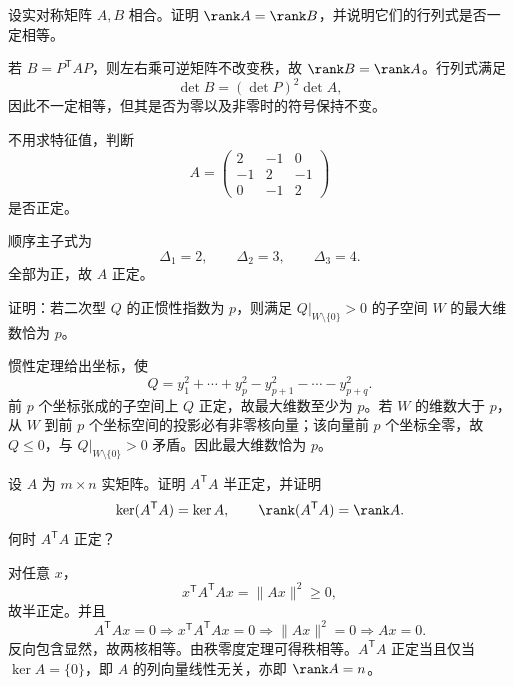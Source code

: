 \begin{exercise}[level=standard]
设实对称矩阵 $A,B$ 相合。证明 $\rank A=\rank B$，并说明它们的行列式是否一定相等。
\begin{solution}
若 $B=P^{\mathsf T}AP$，则左右乘可逆矩阵不改变秩，故 $\rank B=\rank A$。行列式满足
\[
\det B=(\det P)^2\det A,
\]
因此不一定相等，但其是否为零以及非零时的符号保持不变。
\end{solution}
\end{exercise}

\begin{exercise}[level=standard]
不用求特征值，判断
\[
A=\begin{pmatrix}2&-1&0\\-1&2&-1\\0&-1&2\end{pmatrix}
\]
是否正定。
\begin{solution}
顺序主子式为
\[
\Delta_1=2,\qquad \Delta_2=3,\qquad \Delta_3=4.
\]
全部为正，故 $A$ 正定。
\end{solution}
\end{exercise}

\begin{exercise}[level=advanced]
证明：若二次型 $Q$ 的正惯性指数为 $p$，则满足 $Q|_{W\setminus\{0\}}>0$ 的子空间 $W$ 的最大维数恰为 $p$。
\begin{solution}
惯性定理给出坐标，使
\[
Q=y_1^2+\cdots+y_p^2-y_{p+1}^2-\cdots-y_{p+q}^2.
\]
前 $p$ 个坐标张成的子空间上 $Q$ 正定，故最大维数至少为 $p$。若 $W$ 的维数大于 $p$，从 $W$ 到前 $p$ 个坐标空间的投影必有非零核向量；该向量前 $p$ 个坐标全零，故 $Q\le0$，与 $Q|_{W\setminus\{0\}}>0$ 矛盾。因此最大维数恰为 $p$。
\end{solution}
\end{exercise}

\begin{exercise}[level=advanced]
设 $A$ 为 $m\times n$ 实矩阵。证明 $A^{\mathsf T}A$ 半正定，并证明
\[
\ker(A^{\mathsf T}A)=\ker A,\qquad \rank(A^{\mathsf T}A)=\rank A.
\]
何时 $A^{\mathsf T}A$ 正定？
\begin{solution}
对任意 $x$，
\[
x^{\mathsf T}A^{\mathsf T}Ax=\lVert Ax\rVert^2\ge0,
\]
故半正定。并且
\[
A^{\mathsf T}Ax=0\Rightarrow x^{\mathsf T}A^{\mathsf T}Ax=0
\Rightarrow \lVert Ax\rVert^2=0\Rightarrow Ax=0.
\]
反向包含显然，故两核相等。由秩零度定理可得秩相等。$A^{\mathsf T}A$ 正定当且仅当 $\ker A=\{0\}$，即 $A$ 的列向量线性无关，亦即 $\rank A=n$。
\end{solution}
\end{exercise}

